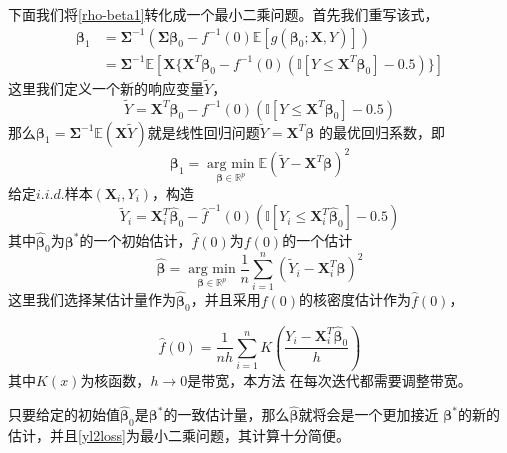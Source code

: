 下面我们将\eqref{rho-beta1}转化成一个最小二乘问题。首先我们重写该式，
\begin{equation}
    \begin{split}
    \bm{\beta}_1 &= \bm{\Sigma}^{-1}(\bm{\Sigma}\bm{\beta}_0 - f^{-1}(0)\mathbb{E}[g(\bm{\beta}_0;\bm{X},Y)])\\
    &= \bm{\Sigma}^{-1}\mathbb{E}[\bm{X}\{\bm{X}^T\bm{\beta}_0 - f^{-1}(0)(\mathbb{I}[Y \leq \bm{X}^T\bm{\beta}_0] - 0.5)\}]
    \end{split}
\end{equation}
这里我们定义一个新的响应变量$\tilde Y$，
\begin{equation}
    \tilde Y = \bm{X}^T\bm{\beta}_0 - f^{-1}(0) (\mathbb{I}[Y \leq \bm{X}^T\bm{\beta}_0] - 0.5)
\end{equation}
那么$\bm{\beta}_1 = \bm{\Sigma}^{-1}\mathbb{E}(\bm{X}\tilde{Y})$就是线性回归问题$\tilde Y = \bm{X}^T\bm{\beta}$
的最优回归系数，即
\begin{equation}\label{beta1-original}
    \bm{\beta}_1 = \underset{\bm{\beta} \in \mathbb{R}^{p}}{\operatorname{arg\ min}} 
    \mathbb{E}(\tilde Y - \bm{X}^T \bm{\beta})^2
\end{equation}
给定$i.i.d.$样本$(\bm{X}_i, Y_i)$，构造
\begin{equation}\label{svny}
    \tilde{Y}_i = \bm{X}_i^T\hat{\bm{\beta}}_0 - \hat{f}^{-1}(0)
    (\mathbb{I}[Y_i \leq \bm{X}_i^T \hat{\bm{\beta}}_0] - 0.5)
\end{equation}
其中$\hat{\bm{\beta}}_0$为$\bm{\beta}^*$的一个初始估计，$\hat{f}(0)$为$f(0)$的一个估计
\begin{equation}\label{yl2loss}
    \hat{\bm{\beta}} = \underset{\bm{\beta} \in \mathbb{R}^{p}}{\operatorname{arg\ min}}
    \frac1{n} \sum_{i=1}^n(\tilde{Y}_i - \bm{X}_i^T\bm{\beta})^2
\end{equation}
这里我们选择某估计量作为$\hat{\bm{\beta}}_0$，并且采用$f(0)$的核密度估计作为$\hat{f}(0)$，

$$
    \hat{f}(0) = \frac1{nh}\sum_{i=1}^nK(\frac{Y_i - \bm{X}^T_i\hat{\bm{\beta}}_0}{h})
$$
其中$K(x)$为核函数，$h \rightarrow 0$是带宽，本方法
在每次迭代都需要调整带宽\cite{svn}。

只要给定的初始值$\hat{\bm{\beta}}_0$是$\bm{\beta}^*$的一致估计量，那么$\hat{\bm{\beta}}$就将会是一个更加接近
$\bm{\beta}^*$的新的估计，并且\eqref{yl2loss}为最小二乘问题，其计算十分简便。

